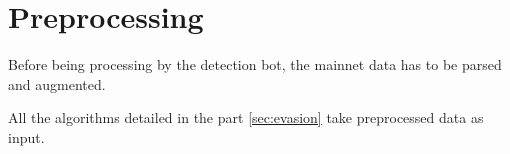 \section{Preprocessing} \label{sec:preprocessing}

Before being processing by the detection bot, the mainnet data has to be parsed and augmented.

All the algorithms detailed in the part \ref{sec:evasion} take preprocessed data as input.


